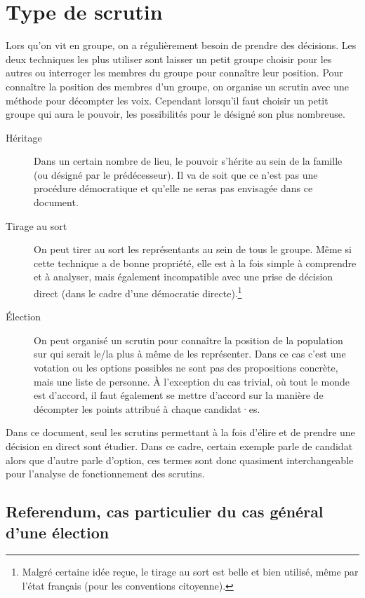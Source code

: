 \documentclass[../report]{subfiles}
\begin{document}
  \section{Type de scrutin}
  Lors qu'on vit en groupe, on a régulièrement besoin de prendre des décisions.
  Les deux techniques les plus utiliser sont laisser un petit groupe choisir pour les autres ou 
  interroger les membres du groupe pour connaître leur position.
  Pour connaître la position des membres d'un groupe, on organise un scrutin avec une méthode pour décompter
  les voix.
  Cependant lorsqu'il faut choisir un petit groupe qui aura le pouvoir, les possibilités pour le désigné son 
  plus nombreuse.
  \begin{description}
  	\item[Héritage] Dans un certain nombre de lieu, le pouvoir s'hérite au sein de la famille (ou désigné par le prédécesseur).
  	Il va de soit que ce n'est pas une procédure démocratique et qu'elle ne seras pas envisagée dans ce document.
  	\item[Tirage au sort] On peut tirer au sort les représentants au sein de tous le groupe. 
  	Même si cette technique a de bonne propriété, elle est à la fois simple à comprendre et à analyser, mais également 
  	incompatible avec une prise de décision direct (dans le cadre d'une démocratie directe).\footnote{Malgré certaine idée reçue, le tirage au sort est belle et bien utilisé, même par l'état français (pour les conventions citoyenne).}
  	\item[Élection] On peut organisé un scrutin pour connaître la position de la population sur qui serait le/la plus 
  	à même de les représenter. 
  	Dans ce cas c'est une votation ou les options possibles ne sont pas des propositions concrète, mais une liste de personne.
  	À l'exception du cas trivial, où tout le monde est d'accord, il faut également se mettre d'accord sur la manière
  	de décompter les points attribué à chaque candidat·es.
  \end{description}
  
  Dans ce document, seul les scrutins permettant à la fois d'élire et de prendre une décision en direct sont étudier.
  Dans ce cadre, certain exemple parle de candidat alors que d'autre parle d'option, ces termes sont donc quasiment 
  interchangeable pour l'analyse de fonctionnement des scrutins.
  
  \subsection[Referendum, cas particulier]{Referendum, cas particulier du cas général d'une élection}
  
\end{document}
